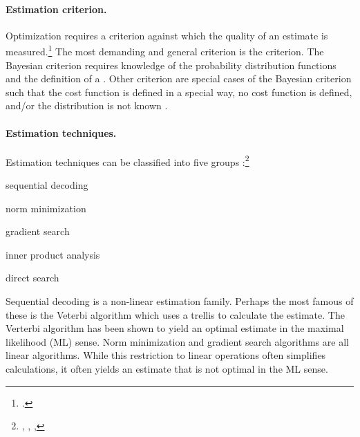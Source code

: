 \paragraph{Estimation criterion.}
Optimization requires a criterion against which the quality of an
estimate is measured.\footnote{.}
The most demanding and general criterion is the  criterion.
The Bayesian criterion requires knowledge of the probability
distribution functions and the definition of a .
Other criterion are special cases of the Bayesian criterion
such that the cost function is defined in a special way,
no cost function is defined, and/or the distribution is not known 
.

\paragraph{Estimation techniques.}
\label{ref:sec:parameter-est}
Estimation techniques can be classified into 
five groups :\footnote{%
  ,
  ,
  ,
  }
\begin{enume}
   \item sequential decoding
   \item norm minimization
   \item gradient search
   \item inner product analysis
   \item direct search
\end{enume}

Sequential decoding is a non-linear estimation family.
Perhaps the most famous of these is the Veterbi algorithm which
uses a trellis to calculate the estimate.
The Verterbi algorithm has been shown to yield an optimal estimate
in the maximal likelihood (ML) sense.
Norm minimization and gradient search algorithms are all linear algorithms.
While this restriction to linear operations often simplifies calculations,
it often yields an estimate that is not optimal in the ML sense.

